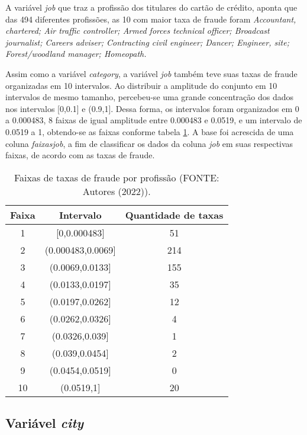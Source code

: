\documentclass{article}
\begin{document}
A variável \textit{job} que traz a profissão dos titulares do cartão de crédito, aponta que das 494 diferentes profissões, as 10 com maior taxa de fraude foram \textit{Accountant, chartered; Air traffic controller; Armed forces technical officer; Broadcast journalist; Careers adviser; Contracting civil engineer; Dancer; Engineer, site; Forest/woodland manager; Homeopath.}

Assim como a variável \textit{category}, a variável \textit{job} também teve suas taxas de fraude organizadas em 10 intervalos. Ao distribuir a amplitude do conjunto em 10 intervalos de mesmo tamanho, percebeu-se uma grande concentração dos dados nos intervalos [0,0.1] e (0.9,1]. Dessa forma, os intervalos foram organizados em 0 a 0.000483, 8 faixas de igual amplitude entre 0.000483 e 0.0519, e um intervalo de 0.0519 a 1, obtendo-se as faixas conforme tabela \ref{tab-job}. A base foi acrescida de uma coluna \textit{faixasjob}, a fim de classificar os dados da coluna \textit{job} em suas respectivas faixas, de acordo com as taxas de fraude.

\begin{table}[!ht]
\centering
\begin{tabular}{ccc}
Faixa & Intervalo            & Quantidade de taxas \\ \hline
1     & {[}0,0.000483{]}     & 51              \\
2     & ({0.000483,0.0069]}  & 214             \\
3     & ({0.0069,0.0133]}    & 155             \\
4     & ({0.0133,0.0197]}    & 35              \\
5     & ({0.0197,0.0262]}    & 12              \\
6     & ({0.0262,0.0326]}    & 4               \\
7     & ({0.0326,0.039]}     & 1               \\
8     & ({0.039,0.0454]}     & 2               \\
9     & ({0.0454,0.0519]}    & 0               \\
10    & ({0.0519,1]}         & 20                
\end{tabular}
\caption{Faixas de taxas de fraude por profissão (FONTE: Autores (2022)).}
\label{tab-job}
\end{table}


\subsection{Variável \textit{city}}
\end{document}
